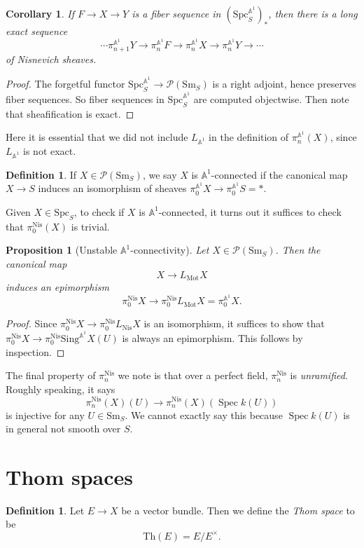 \documentclass{shortart}
\newtheorem{prop}[thm]{Proposition}
\newtheorem{cor}[thm]{Corollary}
\theoremstyle{definition}
\newtheorem{defi}[thm]{Definition}
\newcommand\Sm{\mathrm{Sm}}
\newcommand\Spc{\mathrm{Spc}}
\newcommand\Sing{\mathrm{Sing}}
\newcommand\Nis{\mathrm{Nis}}
\newcommand\Th{\mathrm{Th}}
\newcommand\Pre{\mathcal{P}}
\newcommand\A{\mathbb{A}}
\newcommand\Mot{\mathrm{Mot}}
\DeclareMathOperator\Spec{Spec}
\begin{document}
\begin{cor}
  If $F \to X \to Y$ is a fiber sequence in $(\Spc_S^{\A^1})_*$, then there is a long exact sequence
  \[
    \cdots \pi_{n + 1}^{\A^1} Y \to \pi_n^{\A^1} F \to \pi_n^{\A^1} X \to \pi_n^{\A^1} Y \to \cdots
  \]
  of Nisnevich sheaves.
\end{cor}

\begin{proof}
  The forgetful functor $\Spc_S^{\A^1} \to \Pre(\Sm_S)$ is a right adjoint, hence preserves fiber sequences. So fiber sequences in $\Spc_S^{\A^1}$ are computed objectwise. Then note that sheafification is exact.
\end{proof}
Here it is essential that we did not include $L_{\A^1}$ in the definition of $\pi_n^{\A^1}(X)$, since $L_{\A^1}$ is not exact.

\begin{defi}
  If $X \in \Pre(\Sm_S)$, we say $X$ is $\A^1$-connected if the canonical map $X \to S$ induces an isomorphism of sheaves $\pi_0^{\A^1} X \to \pi_0^{\A^1} S = *$.
\end{defi}

Given $X \in \Spc_S$, to check if $X$ is $\A^1$-connected, it turns out it suffices to check that $\pi_0^{\Nis}(X)$ is trivial.
\begin{prop}[Unstable $\A^1$-connectivity]
  Let $X \in \Pre(\Sm_S)$. Then the canonical map
  \[
    X \to L_{\Mot}X
  \]
  induces an epimorphism
  \[
    \pi_0^{\Nis}X \to \pi_0^{\Nis} L_{\Mot} X = \pi_0^{\A^1} X.
  \]
\end{prop}

\begin{proof}
  Since $\pi_0^{\Nis} X \to \pi_0^{\Nis} L_{\Nis} X$ is an isomorphism, it suffices to show that $\pi_0^{\Nis} X \to \pi_0^{\Nis} \Sing^{\A^1} X(U)$ is always an epimorphism. This follows by inspection.
\end{proof}

The final property of $\pi_n^{\Nis}$ we note is that over a perfect field, $\pi_n^{\Nis}$ is \emph{unramified}. Roughly speaking, it says
\[
  \pi_n^{\Nis}(X)(U) \to \pi_n^{\Nis}(X)(\Spec k(U))
\]
is injective for any $U \in \Sm_S$. We cannot exactly say this because $\Spec k(U)$ is in general not smooth over $S$.

\section{Thom spaces}\label{chapter:thom}
\begin{defi}
  Let $E \to X$ be a vector bundle. Then we define the \emph{Thom space} to be
  \[
    \Th(E) = E / E^\times.
  \]
\end{defi}
\end{document}
